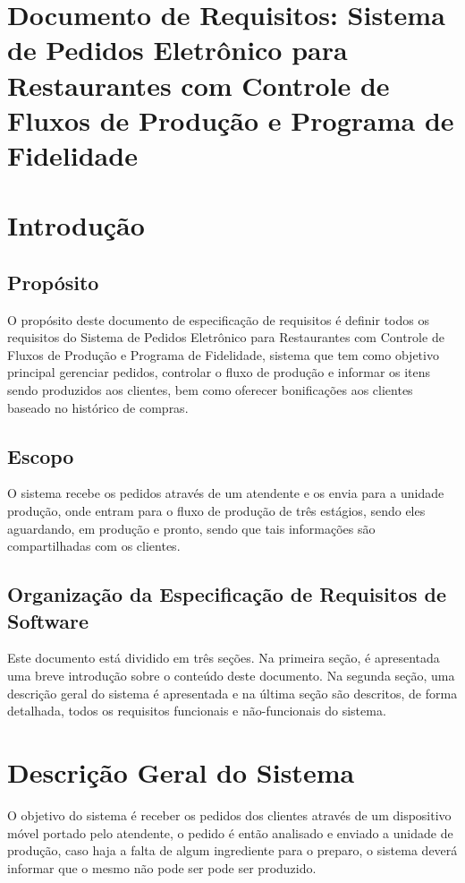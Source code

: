 \documentclass[article, 12pt, oneside, a4paper, brazil]{abntex2}
\begin{document}
 \section*{\textbf{Documento de Requisitos:} Sistema de Pedidos Eletrônico para Restaurantes com Controle de Fluxos de Produção e Programa de Fidelidade}
 \section{Introdução}
 
 \subsection{Propósito}
 O propósito deste documento de especificação de requisitos é definir todos os requisitos do Sistema de Pedidos Eletrônico para Restaurantes com Controle de Fluxos de Produção e Programa de Fidelidade, sistema que tem como objetivo principal gerenciar pedidos, controlar o fluxo de produção e informar os itens sendo produzidos aos clientes, bem como oferecer bonificações aos clientes baseado no histórico de compras.
 
 \subsection{Escopo}
 O sistema recebe os pedidos através de um atendente e os envia para a unidade produção, onde entram para o fluxo de produção de três estágios, sendo eles aguardando, em produção e pronto, sendo que tais informações são compartilhadas com os clientes.
 
 \subsection{Organização da Especificação de Requisitos de Software}
 
 Este documento está dividido em três seções. Na primeira seção, é apresentada uma breve introdução sobre o conteúdo deste documento. Na segunda seção, uma descrição geral do sistema é apresentada e na última seção são descritos, de forma detalhada, todos os requisitos funcionais e não-funcionais do sistema.
 
 \section{Descrição Geral do Sistema}
 O objetivo do sistema é receber os pedidos dos clientes através de um dispositivo móvel portado pelo atendente, o pedido é então analisado e enviado a unidade de produção, caso haja a falta de algum ingrediente para o preparo, o sistema deverá informar que o mesmo não pode ser pode ser produzido. 
 
\end{document}
